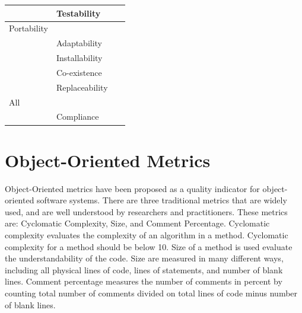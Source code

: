 \begin{table}[ht!]
\begin{tabular}{|l|l|l|}
    ~                  & Testability          & ~           \\ \hline
    Portability        & ~                    & ~           \\ \hline
    ~                  & Adaptability         & ~           \\ \hline
    ~                  & Installability       & ~           \\ \hline
    ~                  & Co-existence         & ~           \\ \hline
    ~                  & Replaceability       & ~           \\ \hline
    All                & ~                    & ~           \\ \hline
    ~                  & Compliance           & ~           \\ \hline
    \end{tabular}
\end{table}




\section{Object-Oriented Metrics}
Object-Oriented metrics have been proposed as a quality indicator for object-oriented software systems. There are three traditional metrics that are widely used, and are well understood by researchers and practitioners\cite{quenelobject}. These metrics are: Cyclomatic Complexity, Size, and Comment Percentage. Cyclomatic complexity evaluates the complexity of an algorithm in a method. Cyclomatic complexity for a method should be below 10\cite{quenelobject}. Size of a method is used evaluate the understandability of the code. Size are measured in many different ways, including all physical lines of code, lines of statements, and number of blank lines. Comment percentage measures the number of comments in percent by counting total number of comments divided on total lines of code minus number of blank lines.

